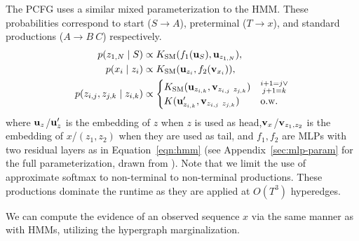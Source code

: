 \documentclass{article}
\begin{document}
The PCFG uses a similar mixed parameterization to the HMM.
These probabilities correspond to start ($S\to A$), preterminal ($T\to x$),
and standard productions ($A\to B\ C$) respectively.
\begin{equation}
\label{eqn:pcfg}
\begin{aligned}
p(z_{1,N} \mid S ) &\propto K_{\mathrm{SM}}(f_1(\mathbf{u}_{S}), \mathbf{u}_{z_{1,N}}),\\
p(x_i \mid z_i) &\propto K_{\mathrm{SM}}(\mathbf{u}_{z_i}, f_2(\mathbf{v}_{x_i})),\\
p( z_{i,j}, z_{j,k} \mid z_{i,k}) &\propto \begin{cases}
  K_{\mathrm{SM}}(\mathbf{u}_{z_{i,k}}, \mathbf{v}_{z_{i,j}\ z_{j,k}}) & \substack{i+1 = j \lor \\j+1=k} \\ 
 K(\mathbf{u}_{z_{i,k}}', \mathbf{v}_{z_{i,j}\ z_{j,k}}) &\text{o.w.} \\
\end{cases}\\
\end{aligned}
\end{equation}
where $\mathbf{u}_{z}$/$\mathbf{u}_z'$ is the embedding of $z$ when $z$ is used as head,$\mathbf{v}_{x}$/$\mathbf{v}_{z_1, z_2}$ is the embedding of $x$/$(z_1, z_2)$ when they are used as tail, and $f_1, f_2$ are MLPs with two residual layers as in
Equation~\ref{eqn:hmm} (see Appendix~\ref{sec:mlp-param} for the full
parameterization, drawn from \citet{kim2019cpcfg}). Note that we limit
the use of approximate softmax to non-terminal to non-terminal
productions. These productions dominate the runtime as they
are applied at $O(T^3)$ hyperedges.

We can compute the evidence of an observed sequence $x$ via the same
manner as with HMMs, utilizing the hypergraph marginalization.




\end{document}
